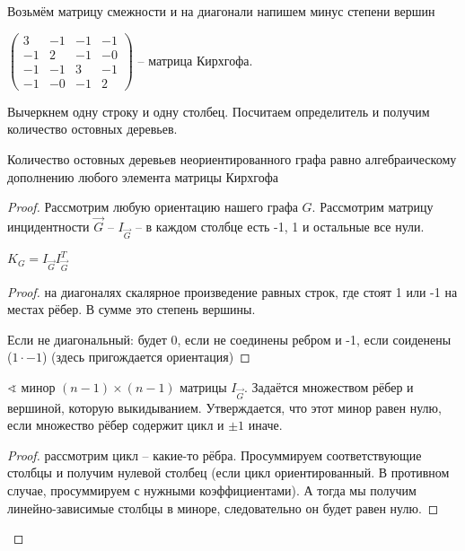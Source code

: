 \documentclass{book}
\theoremstyle{definition}
\begin{document}
    Возьмём матрицу смежности и на диагонали напишем минус степени вершин

    $\begin{pmatrix} 3&-1&-1&-1\\-1&2&-1&-0\\-1&-1&3&-1\\-1&-0&-1&2 \end{pmatrix} $ -- матрица Кирхгофа.

    Вычеркнем одну строку и одну столбец. Посчитаем определитель и получим количество остовных деревьев.

    \begin{theorem}
        Количество остовных деревьев неориентированного графа равно алгебраическому дополнению любого элемента матрицы Кирхгофа
    \end{theorem}
    \begin{proof}
        Рассмотрим любую ориентацию нашего графа $G$. Рассмотрим матрицу инцидентности $\vec G$ --  $I_{\vec G}$ -- в каждом столбце есть -1, 1 и остальные все нули.

         \begin{lemma}
             $K_G = I_{\vec G}I^T_{\vec G}$
        \end{lemma}
        \begin{proof}
            на диагоналях скалярное произведение равных строк, где стоят 1 или -1 на местах рёбер. В сумме это степень вершины.

            Если не диагональный: будет 0, если не соединены ребром и -1, если соиденены ($1 \cdot  -1$) (здесь пригождается ориентация)
        \end{proof}
        \begin{lemma}
            $\sphericalangle $ минор $(n-1)\times (n-1)$ матрицы $I_{\vec G}$. Задаётся множеством рёбер и вершиной, которую выкидыванием. Утверждается, что этот минор равен нулю, если множество рёбер содержит цикл и $\pm 1$ иначе.
        \end{lemma}
        \begin{proof}
            рассмотрим цикл  -- какие-то рёбра. Просуммируем соответствующие столбцы и получим нулевой столбец (если цикл ориентированный. В противном случае, просуммируем с нужными коэффициентами). А тогда мы получим линейно-зависимые столбцы в миноре, следовательно он будет равен нулю.


\end{proof}
\end{proof}
\end{document}

